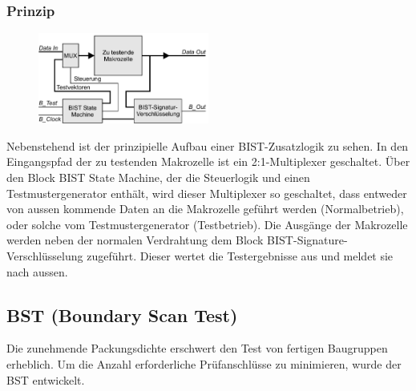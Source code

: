 \subsubsection{Prinzip}
\begin{multicols}{2}
\begin{figure}[H]
    \includegraphics[width=0.5\textwidth]{images/prinzip_bist.png}
\end{figure}
Nebenstehend ist der prinzipielle Aufbau einer BIST-Zusatzlogik zu sehen. In den Eingangspfad der zu testenden Makrozelle ist ein 2:1-Multiplexer geschaltet. Über den Block BIST State Machine, der die Steuerlogik und einen Testmustergenerator enthält, wird dieser Multiplexer so geschaltet, dass entweder von aussen kommende Daten an die Makrozelle geführt werden (Normalbetrieb), oder solche vom Testmustergenerator (Testbetrieb). Die Ausgänge der Makrozelle werden neben der normalen Verdrahtung dem Block BIST-Signature-Verschlüsselung zugeführt. Dieser wertet die Testergebnisse aus und meldet sie nach aussen.
\end{multicols}

\subsection{BST (Boundary Scan Test)}
Die zunehmende Packungsdichte erschwert den Test von fertigen Baugruppen erheblich. Um die Anzahl erforderliche Prüfanschlüsse zu minimieren, wurde der BST entwickelt.

